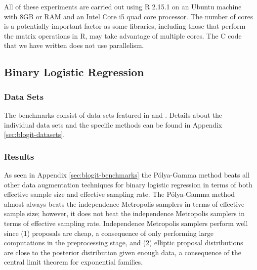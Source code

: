 \documentclass[11pt]{article}
\newcommand{\Polya}{P\'{o}lya}
\begin{document}
All of these experiments are carried out using R 2.15.1 on an Ubuntu machine
with 8GB or RAM and an Intel Core i5 quad core processor.  The number of cores
is a potentially important factor as some libraries, including those that
perform the matrix operations in R, may take advantage of multiple cores.  The C
code that we have written does not use parallelism.

\subsection{Binary Logistic Regression}

\subsubsection{Data Sets}

The benchmarks consist of data sets featured in \cite{holmes-held-2006} and
\cite{fruhwirth-schnatter-fruhwirth-2010}.  Details about the individual data
sets and the specific methods can be found in Appendix
\ref{sec:blogit-datasets}.

\subsubsection{Results}

As seen in Appendix \ref{sec:blogit-benchmarks} the \Polya-Gamma method beats
all other data augmentation techniques for binary logistic regression in terms
of both effective sample size and effective sampling rate.  The \Polya-Gamma
method almost always beats the independence Metropolis samplers in terms of
effective sample size; however, it does not beat the independence Metropolis
samplers in terms of effective sampling rate.  Independence Metropolis samplers
perform well since (1) proposals are cheap, a consequence of only performing
large computations in the preprocessing stage, and (2) elliptic proposal
distributions are close to the posterior distribution given enough data, a
consequence of the central limit theorem for exponential families.
\end{document}
